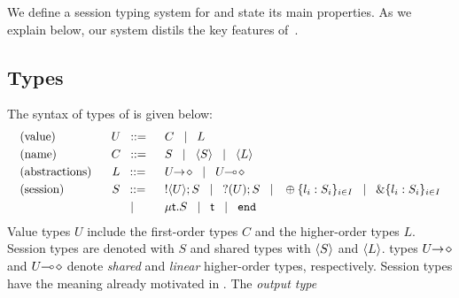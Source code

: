 \noi %
We define a session typing system for \HOp and state its main properties. 
As we explain below, 
our system distils the key features of~\cite{tlca07,MostrousY15}.



\subsection{Types}
The syntax of types of \HOp is given below:
\[
	\begin{array}{cc}
		\begin{array}{lcl}
			\textrm{(value)} & U \;\;::=\;\; & C \;\;\;|\;\;\; L
			\\[1mm]
			\textrm{(name)} & C \;\;::=\;\; & S \;\;\;|\;\;\; \langle S \rangle \;\;\;|\;\;\; \langle L \rangle
			\\[1mm]
			\textrm{(abstractions)}~~ & L \;\;::=\;\; & U\!\! \rightarrow\! \diamond \;\;\;|\;\;\; U\!\! \multimap\! \diamond
			\\[1mm]		
			\textrm{(session)} & S \;\;::=\;\; &  ! \langle U \rangle ; S \;\;\;|\;\;\; ? (U) ; S 
			\;\;\;|\;\;\; \oplus \{l_i:S_i\}_{i \in I}  \;\;\;|\;\;\; \& \{l_i:S_i\}_{i \in I}
			\\[1mm]					
			& \;\;\;|\;\;\; & \mu\mathsf{t}.S \;\;\;|\;\;\; \mathsf{t}  \;\;\;|\;\;\; \mathtt{end}
			
		\end{array}
	\end{array}
	\]
Value types $U$ include
the first-order types $C$ and the higher-order
types $L$. Session types are denoted with $S$ and
shared types with $\langle S \rangle$ and $\langle L \rangle$.
 types $U\!\! \rightarrow\! \diamond$ and $U\!\! \multimap\! \diamond$ denote
{\em shared} and {\em linear} higher-order 
types, respectively.
Session types have the meaning already motivated in .
The {\em output type}
